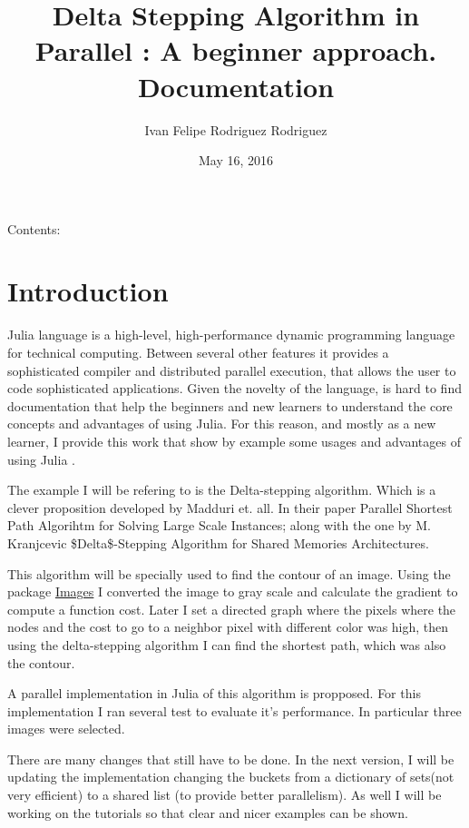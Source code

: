 \documentclass[letterpaper,10pt,english]{sphinxmanual}
\title{Delta Stepping Algorithm in Parallel : A beginner approach. Documentation}
\date{May 16, 2016}
\author{Ivan Felipe Rodriguez Rodriguez}
\begin{document}
\maketitle
\tableofcontents
{}\label{index::doc}


Contents:


\chapter{Introduction}
\label{Introduction:introduction}\label{Introduction:welcome-to-delta-stepping-algorithm-in-parallel-a-beginner-approach-s-documentation}\label{Introduction::doc}\label{Introduction:id1}
Julia language is a high-level, high-performance dynamic programming language for technical computing. Between several other features  it provides a sophisticated compiler and distributed parallel execution, that allows the user to code sophisticated applications. Given the novelty of the language, is hard to find documentation that help the beginners and new learners to understand the core concepts and advantages of using Julia. For this reason, and mostly as a new learner, I provide this work that show by example some usages and advantages of using Julia .

The example I will be refering to is the Delta-stepping algorithm. Which is a clever proposition developed by  Madduri et. all. In their paper Parallel Shortest Path Algorihtm for Solving Large Scale Instances; along with the one by M. Kranjcevic \$Delta\$-Stepping Algorithm for Shared Memories Architectures.

This algorithm will be specially used  to find the contour of an image. Using the package \href{https://github.com/timholy/Images.jl}{Images} I converted the image to gray scale and calculate the gradient to compute a function cost. Later I  set a directed graph where the pixels where the nodes and the cost to go to a neighbor pixel with different color was high, then using the delta-stepping algorithm I can find the shortest path, which was also the contour.

A parallel implementation in Julia of this algorithm is propposed. For this implementation I ran several test to evaluate it's performance. In particular three images were selected.

There are many changes that still have to be done. In the next version, I will be updating the implementation changing the buckets from a dictionary of sets(not very efficient) to a shared list (to provide better parallelism). As well I will be working on the tutorials so that clear and nicer examples can be shown.
\end{document}

